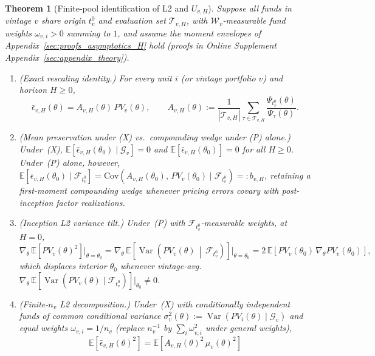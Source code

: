 \documentclass[12pt]{article}
\newtheorem{theorem}{Theorem}
\begin{document}
\begin{theorem}[Finite-pool identification of L2 and $U_{v,H}$]
\label{thm:finite_pool}
Suppose all funds in vintage $v$ share origin $t_v^0$ and evaluation set $\mathcal{T}_{v,H}$, with $\mathcal{W}_v$-measurable fund weights $\omega_{v,i} > 0$ summing to $1$, and assume the moment envelopes of Appendix~\ref{sec:proofs_asymptotics_H} hold (proofs in Online Supplement Appendix~\ref{sec:appendix_theory}).
\begin{enumerate}
  \item[\textbf{T1}] \emph{(Exact rescaling identity.)} For every unit $i$ (or vintage portfolio $v$) and horizon $H \ge 0$,
  \[
  \bar\epsilon_{v,H}(\theta) = A_{v,H}(\theta)\,PV_v(\theta),
  \qquad
  A_{v,H}(\theta) := \frac{1}{|\mathcal{T}_{v,H}|}\sum_{\tau \in \mathcal{T}_{v,H}} \frac{\Psi_{t_v^0}(\theta)}{\Psi_\tau(\theta)}.
  \]
  \item[\textbf{T2}] \emph{(Mean preservation under (X) vs.\ compounding wedge under (P) alone.)} Under~(X), $\mathbb{E}[\bar\epsilon_{v,H}(\theta_0) \mid \mathcal{G}_v] = 0$ and $\mathbb{E}[\bar\epsilon_{v,H}(\theta_0)] = 0$ for all $H \ge 0$. Under~(P) alone, however, $\mathbb{E}[\bar\epsilon_{v,H}(\theta_0) \mid \mathcal{F}_{t_v^0}] = \mathrm{Cov}(A_{v,H}(\theta_0),\,PV_v(\theta_0) \mid \mathcal{F}_{t_v^0}) =: b_{v,H}$, retaining a first-moment compounding wedge whenever pricing errors covary with post-inception factor realizations.
  \item[\textbf{T3}] \emph{(Inception L2 variance tilt.)} Under~(P) with $\mathcal{F}_{t_v^0}$-measurable weights, at $H = 0$,
  \[
  \nabla_\theta\,\mathbb{E}\!\left[PV_v(\theta)^2\right]\Big|_{\theta=\theta_0}
  = \nabla_\theta\,\mathbb{E}\!\left[\operatorname{Var}\!\left(PV_v(\theta) \,\middle|\, \mathcal{F}_{t_v^0}\right)\right]\Big|_{\theta=\theta_0}
  = 2\,\mathbb{E}\!\left[PV_v(\theta_0)\,\nabla_\theta PV_v(\theta_0)\right],
  \]
  which displaces interior $\theta_0$ whenever vintage-avg.\ $\nabla_\theta\,\mathbb{E}[\operatorname{Var}(PV_v(\theta)\mid \mathcal{F}_{t_v^0})]|_{\theta_0} \neq 0$.
  \item[\textbf{T4}] \emph{(Finite-$n_v$ L2 decomposition.)} Under~(X) with conditionally independent funds of common conditional variance $\sigma_v^2(\theta) := \operatorname{Var}(PV_i(\theta)\mid \mathcal{G}_v)$ and equal weights $\omega_{v,i} = 1/n_v$ (replace $n_v^{-1}$ by $\sum_i \omega_{v,i}^2$ under general weights),
  \[
  \mathbb{E}\!\left[\bar\epsilon_{v,H}(\theta)^2\right]
  = \mathbb{E}\!\left[A_{v,H}(\theta)^2\,\mu_v(\theta)^2\right]
\]
\end{enumerate}
\end{theorem}
\end{document}
